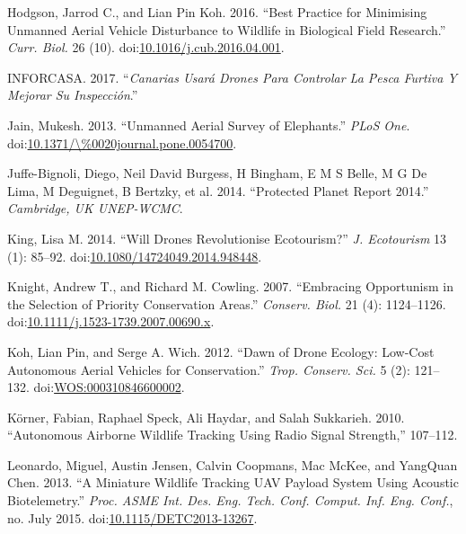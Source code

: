 \documentclass[]{interact}
\theoremstyle{plain}%
\theoremstyle{definition}
\theoremstyle{remark}
\begin{document}
\hypertarget{ref-hodgson_best_2016}{}
Hodgson, Jarrod C., and Lian Pin Koh. 2016. ``Best Practice for
Minimising Unmanned Aerial Vehicle Disturbance to Wildlife in Biological
Field Research.'' \emph{Curr. Biol.} 26 (10).
doi:\href{https://doi.org/10.1016/j.cub.2016.04.001}{10.1016/j.cub.2016.04.001}.

\hypertarget{ref-Canarias2017}{}
INFORCASA. 2017. ``\emph{Canarias Usará Drones Para Controlar La Pesca
Furtiva Y Mejorar Su Inspección}.''

\hypertarget{ref-jain_unmanned_2013}{}
Jain, Mukesh. 2013. ``Unmanned Aerial Survey of Elephants.'' \emph{PLoS
One}.
doi:\href{https://doi.org/10.1371//\%0020journal.pone.0054700}{10.1371/\textbackslash{}\%0020journal.pone.0054700}.

\hypertarget{ref-juffe-bignoli_protected_2014}{}
Juffe-Bignoli, Diego, Neil David Burgess, H Bingham, E M S Belle, M G De
Lima, M Deguignet, B Bertzky, et al. 2014. ``Protected Planet Report
2014.'' \emph{Cambridge, UK UNEP-WCMC}.

\hypertarget{ref-king_will_2014}{}
King, Lisa M. 2014. ``Will Drones Revolutionise Ecotourism?'' \emph{J.
Ecotourism} 13 (1): 85--92.
doi:\href{https://doi.org/10.1080/14724049.2014.948448}{10.1080/14724049.2014.948448}.

\hypertarget{ref-knight_embracing_2007}{}
Knight, Andrew T., and Richard M. Cowling. 2007. ``Embracing Opportunism
in the Selection of Priority Conservation Areas.'' \emph{Conserv. Biol.}
21 (4): 1124--1126.
doi:\href{https://doi.org/10.1111/j.1523-1739.2007.00690.x}{10.1111/j.1523-1739.2007.00690.x}.

\hypertarget{ref-koh_dawn_2012}{}
Koh, Lian Pin, and Serge A. Wich. 2012. ``Dawn of Drone Ecology:
Low-Cost Autonomous Aerial Vehicles for Conservation.'' \emph{Trop.
Conserv. Sci.} 5 (2): 121--132.
doi:\href{https://doi.org/WOS:000310846600002}{WOS:000310846600002}.

\hypertarget{ref-korner_autonomous_2010}{}
Körner, Fabian, Raphael Speck, Ali Haydar, and Salah Sukkarieh. 2010.
``Autonomous Airborne Wildlife Tracking Using Radio Signal Strength,''
107--112.

\hypertarget{ref-leonardo_miniature_2013}{}
Leonardo, Miguel, Austin Jensen, Calvin Coopmans, Mac McKee, and
YangQuan Chen. 2013. ``A Miniature Wildlife Tracking UAV Payload System
Using Acoustic Biotelemetry.'' \emph{Proc. ASME Int. Des. Eng. Tech.
Conf. Comput. Inf. Eng. Conf.}, no. July 2015.
doi:\href{https://doi.org/10.1115/DETC2013-13267}{10.1115/DETC2013-13267}.
\end{document}
